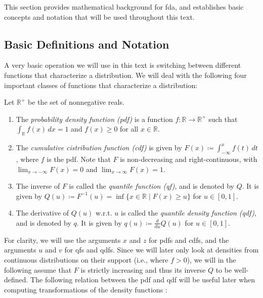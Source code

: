 This section provides mathematical background for fda, and establishes basic concepts
and notation that will be used throughout this text.

\subsection{Basic Definitions and Notation}
\label{sec:basics}
A very basic operation we will use in this text is switching between different functions
that characterize a distribution. We will deal with the following four important classes
of functions that characterize a distribution:

\begin{definition}
    \label{def:distributionfuncs}
    Let \(\mathbb{R}^+\) be the set of nonnegative reals.
    \begin{enumerate}
        \item The \textit{probability density function (pdf)} is a function
        \( f: \mathbb{R} \to \mathbb{R}^+ \) such that \( \int_{\mathbb{R}} f(x) \, dx = 1 \)
        and \( f(x) \geq 0 \) for all \( x \in \mathbb{R} \).

        \item The \textit{cumulative cistribution function (cdf)} is given by
        \( F(x) \coloneqq \int_{-\infty}^{x} f(t) \, dt \), where \( f \) is the pdf.
        Note that \( F\) is non-decreasing and right-continuous,
        with \( \lim_{{x \to -\infty}} F(x) = 0 \) and \( \lim_{{x \to \infty}} F(x) = 1 \).

        \item The inverse of \(F\) is called the \textit{quantile function (qf)},
        and is denoted by \(Q\). It is given by \( Q(u) \coloneqq F^{-1}(u) =
        \inf \{ x \in \mathbb{R} \mid F(x) \geq u \} \) for \( u \in [0, 1] \).

        \item The derivative of \(Q(u)\) w.r.t. \(u\) is called the \textit{quantile
        density function (qdf)}, and is denoted by \(q\). It is given by
        \(q(u) \coloneqq \frac{d}{du} Q(u)\) for \( u \in [0, 1] \).
    \end{enumerate}
\end{definition}

For clarity, we will use the arguments $x$ and $z$ for pdfs and cdfs, and the arguments
$u$ and $v$ for qfs and qdfs. Since we will later only look at densities from continuous
distributions on their support (i.e., where $f > 0$), we will in the following assume
that $F$ is strictly increasing and thus its inverse $Q$ to be well-defined.
The following relation between the pdf and qdf will be useful later when computing
transformations of the density functions \parencite[cf.][]{Jones1992}:

